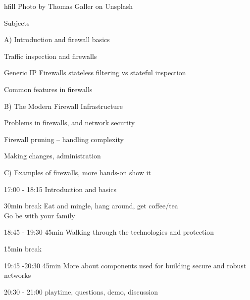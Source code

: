 \documentclass[Screen16to9,17pt]{foils}
\begin{document}
hfill {\small Photo by Thomas Galler on Unsplash}



\begin{list1}
\item Subjects
\item A) Introduction and firewall basics
\begin{list2}
\item Traffic inspection and firewalls
\item Generic IP Firewalls stateless filtering vs stateful inspection
\item Common features in firewalls
\end{list2}
\item B) The Modern Firewall Infrastructure
\begin{list2}
\item Problems in firewalls, and network security
\item Firewall pruning -- handling complexity
\item Making changes, administration
\item C) Examples of firewalls, more hands-on show it
\end{list2}
\end{list1}


\begin{list2}
\item 17:00 - 18:15  Introduction and basics\\

\item 30min break  Eat and mingle, hang around, get coffee/tea\\
Go be with your family

\item 18:45 - 19:30 45min Walking through the technologies and protection\\

\item 15min break\\

\item 19:45 -20:30 45min More about components used for building secure and robust networks\\

\item 20:30 - 21:00 playtime, questions, demo, discussion
\end{list2}
\end{document}
